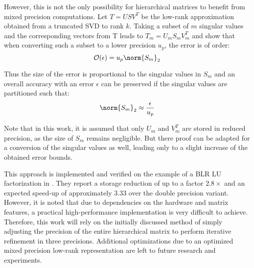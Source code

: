 However, this is not the only possibility for hierarchical matrices to benefit from mixed precision computations. Let $T=USV^T$ be the low-rank approximation obtained from a truncated SVD to rank $k$. Taking a subset of $m$ singular values and the corresponding vectors from T leads to $T_m=U_mS_mV^T_m$ and \cite{amestoy_mixed_2021} show that when converting such a subset to a lower precision $u_p$, the error is of order:
\begin{equation}
    \mathcal{O}(\epsilon)=u_p\norm{S_m}_2
\end{equation}

\noindent Thus the size of the error is proportional to the singular values in $S_m$ and an overall accuracy with an error $\epsilon$ can be preserved if the singular values are partitioned such that:
\begin{equation}
    \norm{S_m}_2 \approx \frac{\epsilon}{u_p}
\end{equation}

\noindent Note that in this work, it is assumed that only $U_m$ and $V^T_m$ are stored in reduced precision, as the size of $S_m$ remains negligible. But there proof can be adapted for a conversion of the singular values as well, leading only to a slight increase of the obtained error bounds. 

This approach is implemented and verified on the example of a BLR LU factorization in \cite{amestoy_mixed_2021}. They report a storage reduction of up to a factor $2.8\times$ and an expected speed-up of approximately $3.33$ over the double precision variant. However, it is noted that due to dependencies on the hardware and matrix features, a practical high-performance implementation is very difficult to achieve. Therefore, this work will rely on the initially discussed method of simply adjusting the precision of the entire hierarchical matrix to perform iterative refinement in three precisions. Additional optimizations due to an optimized mixed precision low-rank representation are left to future research and experiments.